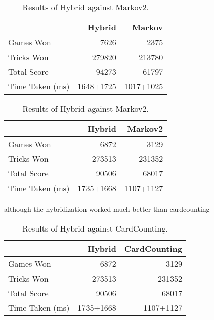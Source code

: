 \begin{table}[ht]
    \begin{minipage}{.5\linewidth}
        \centering
        \begin{tabular}{l|rr}
            ~               &  Hybrid &   Markov  \\  \hline
            Games Won       &   7626        &   2375   \\
            Tricks Won      &   279820      &   213780 \\
            Total Score     &   94273      &   61797  \\
            Time Taken (ms) &   1648+1725   &   1017+1025
        \end{tabular}
        \caption{Results of Hybrid against Markov.}
        \label{tab:hybrid_markov}
    \end{minipage}%
    \begin{minipage}{.5\linewidth}
        \centering
        \begin{tabular}{l|rr}
            ~               &  Hybrid &   Markov2  \\  \hline
            Games Won       &   6872        &   3129   \\
            Tricks Won      &   273513      &   231352 \\
            Total Score     &   90506      &   68017  \\
            Time Taken (ms) &   1735+1668   &   1107+1127
        \end{tabular}
        \caption{Results of Hybrid against Markov2.}
        \label{tab:hybrid_markov2}
    \end{minipage} 
\end{table}





although the hybridization worked much better than cardcounting

\begin{table}[ht]
    \centering
    \begin{tabular}{l|rr}
        ~               &  Hybrid &   CardCounting  \\  \hline
        Games Won       &   6872        &   3129   \\
        Tricks Won      &   273513      &   231352 \\
        Total Score     &   90506      &   68017  \\
        Time Taken (ms) &   1735+1668   &   1107+1127
    \end{tabular}
    \caption{Results of Hybrid against CardCounting.}
    \label{tab:hybrid_cardcounting}
\end{table}



